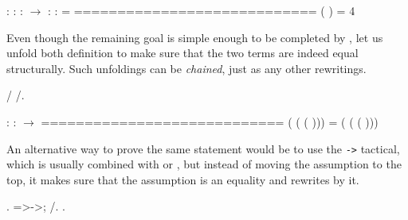 \coqdoceol
\coqdocemptyline
\coqdocindent{1.00em}
 : \coqdoceol
\coqdocindent{1.00em}
 : \coqdoceol
\coqdocindent{1.00em}
 :  \ensuremath{\rightarrow} \coqdoceol
\coqdocindent{1.00em}
 : \coqdoceol
\coqdocindent{1.00em}
 :  =   \coqdoceol
\coqdocindent{1.00em}
============================\coqdoceol
\coqdocindent{1.50em}
  (  ) =  4  

\coqdocemptyline


Even though the remaining goal is simple enough to be completed by
, let us unfold both definition to make sure that the two terms
are indeed equal structurally. Such unfoldings can be \textit{chained}, just
as any other rewritings.


 \begin{coqdoccode}
\coqdocemptyline
\coqdocnoindent
{} / /.\coqdoceol
\coqdocemptyline
\end{coqdoccode}
\coqdoceol
\coqdocemptyline
\coqdocindent{1.00em}
 : \coqdoceol
\coqdocindent{1.00em}
 :  \ensuremath{\rightarrow} \coqdoceol
\coqdocindent{1.00em}
============================\coqdoceol
\coqdocindent{1.50em}
 ( ( ( ))) =  ( ( ( )))

\coqdocemptyline


An alternative way to prove the same statement would be to use the
\texttt{->} \ssrtl{->} tactical, which is usually combined with
 or , but instead of moving the assumption to the top, it
makes sure that the assumption is an equality and rewrites by it.


 \begin{coqdoccode}
\coqdocemptyline
\coqdocnoindent
{}.\coqdoceol
\coqdocnoindent
{} =>->;  /.\coqdoceol
\coqdocnoindent
{}.\coqdoceol
\coqdocemptyline
\end{coqdoccode}


